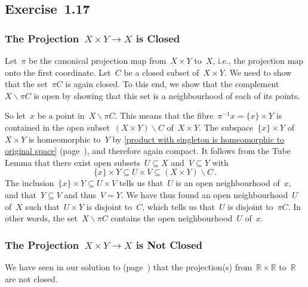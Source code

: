 \subsection{Exercise~1.17}



\subsubsection{The Projection~$X × Y \to X$ is Closed}

Let~$π$ be the canonical projection map from~$X × Y$ to~$X$, i.e., the projection map onto the first coordinate.
Let~$C$ be a closed subset of~$X × Y$.
We need to show that the set~$π C$ is again closed.
To this end, we show that the complement~$X ∖ π C$ is open by showing that this set is a neighbourhood of each of its points.

So let~$x$ be a point in~$X ∖ π C$.
This means that the fibre~$π^{-1} x = \{ x \} × Y$ is contained in the open subset~$(X × Y) ∖ C$ of~$X × Y$.
The subspace~$\{ x \} × Y$ of~$X × Y$ is homeomorphic to~$Y$ by \cref{product with singleton is homeomorphic to original space} (page~\pageref{product with singleton is homeomorphic to original space}), and therefore again compact.
It follows from the Tube Lemma that there exist open subsets~$U ⊆ X$ and~$V ⊆ Y$ with~
\[
	\{ x \} × Y ⊆ U × V ⊆ (X × Y) ∖ C \,.
\]
The inclusion~$\{ x \} × Y ⊆ U × V$ tells us that~$U$ is an open neighbourhood of~$x$, and that~$Y ⊆ V$ and thus~$V = Y$.
We have thus found an open neighbourhood~$U$ of~$X$ such that~$U × Y$ is disjoint to~$C$, which tells us that~$U$ is disjoint to~$π C$.
In other words, the set~$X ∖ π C$ contains the open neighbourhood~$U$ of~$x$.



\subsubsection{The Projection~$X × Y \to X$ is Not Closed}

We have seen in our solution to  (page~\pageref{exercise 1.14}) that the projection(s) from~$ℝ × ℝ$ to~$ℝ$ are not closed.
